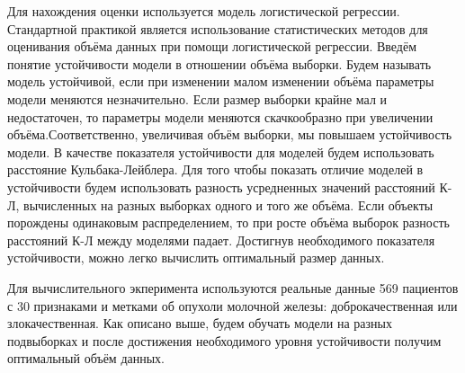 \documentclass[12pt,twoside]{article}
\begin{document}
Для нахождения оценки используется модель логистической регрессии\cite{hosmer2013applied}. Стандартной практикой является использование статистических методов\cite{demidenko2007sample} для оценивания объёма данных при помощи логистической регрессии. Введём понятие устойчивости модели в отношении объёма выборки. Будем называть модель устойчивой, если при изменении малом изменении объёма параметры модели меняются незначительно.
Если размер выборки крайне мал и недостаточен, то параметры модели меняются скачкообразно при увеличении объёма.Соответственно, увеличивая объём выборки, мы повышаем устойчивость модели. В качестве показателя устойчивости
для моделей будем использовать расстояние Кульбака-Лейблера. Для того чтобы показать отличие моделей в устойчивости будем использовать разность усредненных значений расстояний К-Л, вычисленных на разных выборках одного и того же объёма. Если объекты порождены одинаковым распределением, то при росте объёма выборок разность расстояний К-Л между моделями падает. Достигнув необходимого показателя устойчивости, можно легко вычислить оптимальный размер данных.

Для вычислительного экперимента используются реальные данные 569 пациентов с 30 признаками и метками об опухоли молочной железы: доброкачественная или злокачественная. Как описано выше, будем обучать модели на разных подвыборках и после достижения необходимого уровня устойчивости получим оптимальный объём данных.



\end{document}
